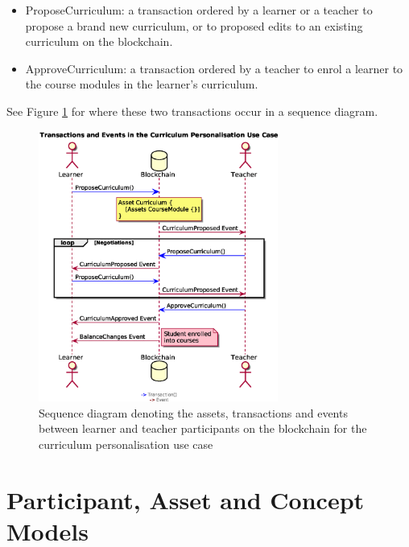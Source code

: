 \begin{itemize}
    \setlength\itemsep{0em}            
    \item ProposeCurriculum: a transaction ordered by a learner or a teacher to propose 
    a brand new curriculum, or to proposed edits to an existing curriculum on the blockchain.
    \item ApproveCurriculum: a transaction ordered by a teacher to enrol a learner to 
    the course modules in the learner's curriculum.
\end{itemize}

See Figure \ref{fig:personalisationloop} for where these two transactions occur in a sequence diagram.

\begin{figure}[!ht] 
    \centering    
    \includegraphics[width=0.7\textwidth]{personalisationloop}
    \caption[Curriculum Personalisation Use Case]
        {Sequence diagram denoting the assets, transactions and events between 
         learner and teacher participants on the blockchain for the curriculum personalisation use case} 
    \label{fig:personalisationloop}
\end{figure}



\section{Participant, Asset and Concept Models}

